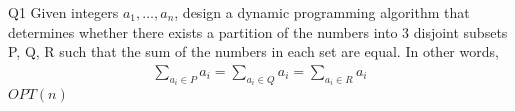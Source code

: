 \begin{problem}
  {Q1}
  Given integers $a_1, \dots , a_n$, design a dynamic programming algorithm that determines
  whether there exists a partition of the numbers into 3 disjoint subsets P, Q, R such that the sum
  of the numbers in each set are equal. In other words,
  \begin{align*}
      \sum_{a_i \in P} a_i = \sum_{a_i \in Q} a_i = \sum_{a_i \in R} a_i
  \end{align*}
  \noindent
  $OPT(n)$
\end{problem}
